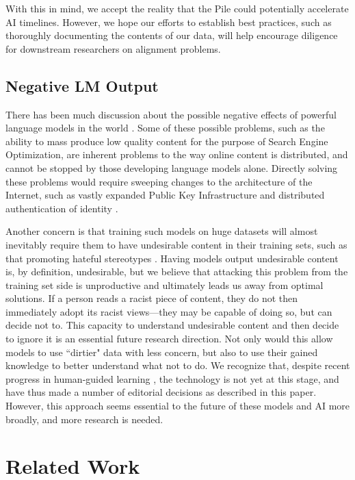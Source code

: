 With this in mind, we accept the reality that the Pile could potentially accelerate AI timelines. However, we hope our efforts to establish best practices, such as thoroughly documenting the contents of our data, will help encourage diligence for downstream researchers on alignment problems.

\subsection{Negative LM Output}

There has been much discussion about the possible negative effects of powerful language models in the world \citep{GPT3,brundage_malicious_2018}. Some of these possible problems, such as the ability to mass produce low quality content for the purpose of Search Engine Optimization, are inherent problems to the way online content is distributed, and cannot be stopped by those developing language models alone. Directly solving these problems would require sweeping changes to the architecture of the Internet, such as vastly expanded Public Key Infrastructure and distributed authentication of identity \citep{practical_cryptography}. 

Another concern is that training such models on huge datasets will almost inevitably require them to have undesirable content in their training sets, such as that promoting hateful stereotypes \citep{christian2020alignment}. Having models output undesirable content is, by definition, undesirable, but we believe that attacking this problem from the training set side is unproductive and ultimately leads us away from optimal solutions. If a person reads a racist piece of content, they do not then immediately adopt its racist views---they may be capable of doing so, but can decide not to. This capacity to understand undesirable content and then decide to ignore it is an essential future research direction. Not only would this allow models to use ``dirtier" data with less concern, but also to use their gained knowledge to better understand what not to do. We recognize that, despite recent progress in human-guided learning \citep{learningsum}, the technology is not yet at this stage, and have thus made a number of editorial decisions as described in this paper. However, this approach seems essential to the future of these models and AI more broadly, and more research is needed.

\section{Related Work}

